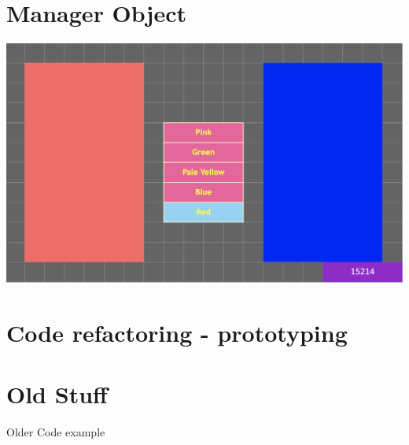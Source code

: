\documentclass[a4paper,12pt]{article}
\begin{document}
\section{Manager Object}
\begin{center}
	\includegraphics[width=18cm, angle=0, origin=c]{newbasicbuttons/changingcolours.png}
\end{center}
\newpage
\section{Code refactoring - prototyping}
\newpage
\section{Old Stuff}
Older Code example

\end{document}
